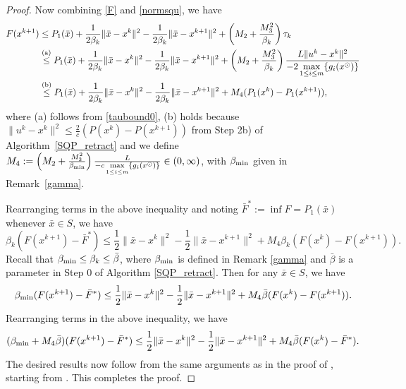 \documentclass[10pt]{article}
\numberwithin{equation}{section}
\def\xfeas{x^\odot}
\def\betamin{{\rm \beta_{min}}}
\def\xfeasss{x^\circledcirc}
\begin{document}
\begin{proof}
Now combining \eqref{F} and \eqref{normsqu}, we have
\begin{align}
F(x^{k+1})&\leq P_1(\bar{x}) + \frac{1}{2\beta_k}\|\bar{x} - x^k\|^2 - \frac{1}{2\beta_k}\|\bar{x} - x^{k+1}\|^2 + \left(M_2 + \frac{M_3^2}{\beta_k}\right)\tau_k \nonumber\\
&\overset{\rm (a)}\leq P_1(\bar{x}) + \frac{1}{2\beta_k}\|\bar{x} - x^k\|^2 - \frac{1}{2\beta_k}\|\bar{x} - x^{k+1}\|^2 + \left(M_2 + \frac{M_3^2}{\beta_k}\right)\frac{L\|u^k - x^k\|^2}{-2\max\limits_{1 \le i \le m}\{g_i(\xfeas)\}}\nonumber\\
&\overset{\rm (b)}\leq P_1(\bar{x}) + \frac{1}{2\beta_k}\|\bar{x} - x^k\|^2 - \frac{1}{2\beta_k}\|\bar{x} - x^{k+1}\|^2 + M_4(P_1(x^k) - P_1(x^{k+1})), \nonumber
\end{align}
where (a) follows from \eqref{taubound0}, (b) holds because $\|u^k - x^k\|^2 \leq \frac{2}{c}(P(x^k) - P(x^{k+1}))$ from Step 2b) of Algorithm~\ref{SQP_retract} and we define $M_4 := \left(M_2 + \frac{M_3^2}{\betamin}\right)\frac{L}{-c\max\limits_{1 \le i \le m}\{g_i(\xfeas)\}}\in (0,\infty)$, with $\betamin$ given in Remark~\ref{gamma}.

Rearranging terms in the above inequality and noting $\bar{F}^* := \inf F = P_1(\bar{x})$ whenever $\bar{x}\in S$, we have
\[
\beta_k(F(x^{k+1}) - \bar{F}^*)\leq \frac{1}{2}\|\bar{x} - x^k\|^2 - \frac{1}{2}\|\bar{x} - x^{k+1}\|^2 + M_4\beta_k(F(x^k) - F(x^{k+1})).
\]
Recall that $\betamin\leq\beta_k \leq\bar{\beta}$, where $\betamin$ is defined in Remark \ref{gamma} and $\bar{\beta}$ is a parameter in Step 0 of Algorithm \ref{SQP_retract}. Then for any $\bar{x} \in S$, we have
\[
\betamin(F(x^{k+1}) - \bar{F}^*)\leq \frac{1}{2}\|\bar{x} - x^k\|^2 - \frac{1}{2}\|\bar{x} - x^{k+1}\|^2 + M_4\bar{\beta}(F(x^k) - F(x^{k+1})).
\]
Rearranging terms in the above inequality, we have
\begin{equation*}
(\betamin + M_4\bar{\beta})(F(x^{k+1}) - \bar{F}^*)\leq \frac{1}{2}\|\bar{x} - x^k\|^2 - \frac{1}{2}\|\bar{x} - x^{k+1}\|^2 + M_4\bar{\beta}(F(x^k) - \bar{F}^*).
\end{equation*}
The desired results now follow from the same arguments as in the proof of \cite[Theorem~3.12]{YuLP20}, starting from \cite[Eq.~(3.16)]{YuLP20}. This completes the proof.
\end{proof}

\end{document}
